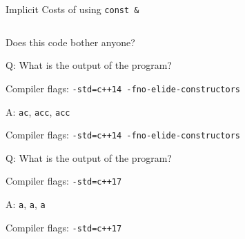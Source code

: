 \documentclass[compress,aspectratio=1610]{beamer}
\newcommand{\inputcpplisting}[1]{}
\newcommand{\inputasmlisting}[1]{}
\begin{document}
\begin{frame}[fragile]{Implicit Costs of using \texttt{const \&}}
    \begin{columns}[t]
        \begin{column}{.45\textwidth}
            \inputasmlisting{snippet1b}
        \end{column}
        \begin{column}{.45\textwidth}
            \inputasmlisting{snippet2b}
        \end{column}
    \end{columns}
\end{frame}

\begin{frame}[fragile]
    \inputcpplisting{snippet8}
\end{frame}

\begin{frame}[fragile]{Does this code bother anyone?}
    \inputcpplisting{snippet3}
\end{frame}

\begin{frame}[fragile]{Q: What is the output of the program?}
    \begin{center}
        Compiler flags: \texttt{-std=c++14 -fno-elide-constructors}
    \end{center}

    \inputcpplisting{snippet4a}
\end{frame}

\begin{frame}[fragile]{A: \texttt{ac}, \texttt{acc}, \texttt{acc}}
    \begin{center}
        Compiler flags: \texttt{-std=c++14 -fno-elide-constructors}
    \end{center}

    \inputcpplisting{snippet4a}
\end{frame}

\begin{frame}[fragile]{Q: What is the output of the program?}
    \begin{center}
        Compiler flags: \texttt{-std=c++17}
    \end{center}

    \inputcpplisting{snippet4b}
\end{frame}

\begin{frame}[fragile]{A: \texttt{a}, \texttt{a}, \texttt{a}}
    \begin{center}
        Compiler flags: \texttt{-std=c++17}
    \end{center}

    \inputcpplisting{snippet4b}
\end{frame}
\end{document}
